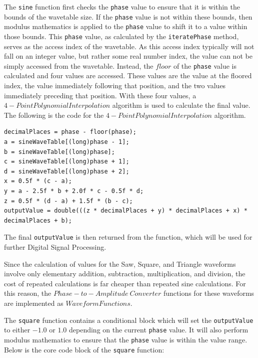 \documentclass[a4paper,12pt]{report}
\begin{document}
The \texttt{sine} function first checks the \texttt{phase} value to ensure that it is within the bounds of the wavetable size. If the \texttt{phase} value is not within these bounds, then modulus mathematics is applied to the \texttt{phase} value to shift it to a value within those bounds. This \texttt{phase} value, as calculated by the \texttt{iteratePhase} method, serves as the access index of the wavetable. As this access index typically will not fall on an integer value, but rather some real number index, the value can not be simply accessed from the wavetable. Instead, the $floor$ of the \texttt{phase} value is calculated and four values are accessed. These values are the value at the floored index, the value immediately following that position, and the two values immediately preceding that position. With these four values, a $4-Point Polynomial Interpolation$ algorithm is used to calculate the final value. The following is the code for the $4-Point Polynomial Interpolation$ algorithm.

 \noindent\begin{minipage}{\linewidth} \begin{lstlisting}[caption={4-Point Polynomial Interpolation implementation},label={code:4ptpolyinterpolation},captionpos=b]
decimalPlaces = phase - floor(phase);
a = sineWaveTable[(long)phase - 1];
b = sineWaveTable[(long)phase];
c = sineWaveTable[(long)phase + 1];
d = sineWaveTable[(long)phase + 2];
x = 0.5f * (c - a);
y = a - 2.5f * b + 2.0f * c - 0.5f * d;
z = 0.5f * (d - a) + 1.5f * (b - c);
outputValue = double(((z * decimalPlaces + y) * decimalPlaces + x) * decimalPlaces + b);
\end{lstlisting} \end{minipage}

The final \texttt{outputValue} is then returned from the function, which will be used for further Digital Signal Processing.

Since the calculation of values for the Saw, Square, and Triangle waveforms involve only elementary addition, subtraction, multiplication, and division, the cost of repeated calculations is far cheaper than repeated sine calculations. For this reason, the $Phase-to-Amplitude\ Converter$ functions for these waveforms are implemented as $Waveform Functions$.

The \texttt{square} function contains a conditional block which will set the \texttt{outputValue} to either $-1.0$ or $1.0$ depending on the current \texttt{phase} value. It will also perform modulus mathematics to ensure that the \texttt{phase} value is within the value range. Below is the core code block of the \texttt{square} function:
\end{document}
